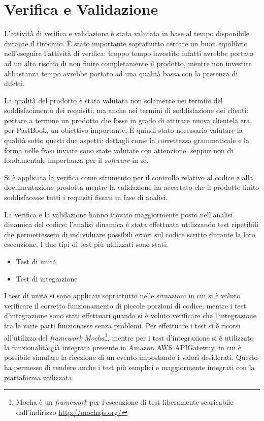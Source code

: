 
\chapter{Verifica e Validazione}

L'attività di verifica e validazione è stata valutata in base al tempo
disponibile durante il tirocinio. È stato importante soprattutto cercare un
buon equilibrio nell'eseguire l'attività di verifica: troppo tempo investito
infatti avrebbe portato ad un alto rischio di non finire completamente il
prodotto, mentre non investire abbastanza tempo avrebbe portato ad una qualità
bassa con la presenza di difetti.

La qualità del prodotto è stata valutata non solamente nei termini del
soddisfacimento dei requisiti, ma anche nei termini di soddisfazione dei
clienti: portare a termine un prodotto che fosse in grado di attirare nuova
clientela era, per PastBook, un obiettivo importante. È quindi stato necessario
valutare la qualità sotto questi due aspetti: dettagli come la correttezza
grammaticale e la forma nelle frasi inviate sono state valutate con attenzione,
seppur non di fondamentale importanza per il \textit{software} in sé.

Si è applicata la verifica come strumento per il controllo relativo
al codice e alla documentazione prodotta mentre la validazione ha accertato
che il prodotto finito soddisfacesse tutti i requisiti fissati in fase di
analisi.

La verifica e la validazione hanno trovato maggiormente posto nell'analisi
dinamica del codice: l'analisi dinamica è stata effettuata utilizzando test
ripetibili che permettessero di individuare possibili errori sul codice
scritto durante la loro esecuzione.
I due tipi di test più utilizzati sono stati:
\begin{itemize}
  \item Test di unità
  \item Test di integrazione
\end{itemize}
I test di unità si sono applicati soprattutto nelle situazioni in cui si è
voluto verificare il corretto funzionamento di piccole porzioni di codice,
mentre i test d'integrazione sono stati effettuati quando si è voluto
verificare che l'integrazione tra le varie parti funzionasse senza problemi.
Per effettuare i test si è ricorsi all'utilizzo del \textit{framework}
\textit{Mocha}\footnote{Mocha è un \textit{framework} per l'esecuzione di test
liberamente scaricabile dall'indirizzo \url{http://mochajs.org/}},
mentre per i test d'integrazione si è utilizzato la funzionalità già integrata
presente in Amazon AWS APIGateway, in cui è possibile simulare la ricezione di
un evento impostando i valori desiderati. Questo ha permesso di rendere anche i
test più semplici e maggiormente integrati con la piattaforma utilizzata.

